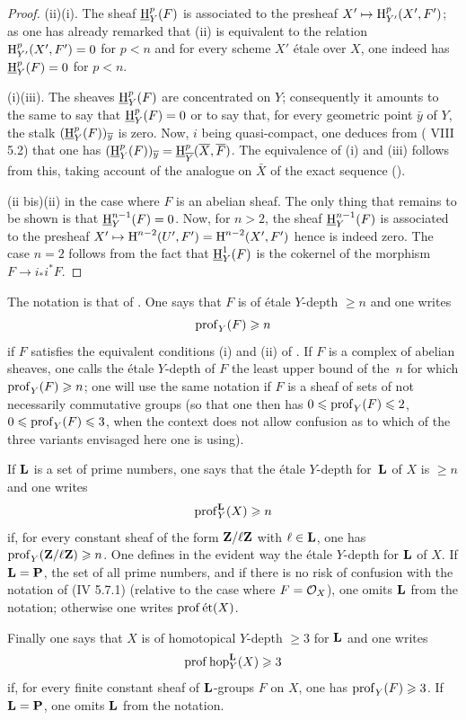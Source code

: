 \begin{proof}
\textup{(ii)}\ALORS \textup{(i)}. The sheaf ${\operatorname{\underline{H}}}_Y^p(F)$ is associated to the presheaf $X'\mto \H_{Y'}^p(X', F')$; as one has already remarked that \textup{(ii)} is equivalent to the relation $\operatorname{H}_{Y'}^p(X', F')=0$ for $p<n$ and for every scheme $X'$ \'etale over $X$, one indeed has ${\operatorname{\underline{H}}}_Y^p(F)=0$ for $p<n$.

\textup{(i)}\SSI \textup{(iii)}. The sheaves ${\operatorname{\underline{H}}}_Y^p(F)$ are concentrated on $Y$; consequently it amounts to the same to say that ${\operatorname{\underline{H}}}_Y^p(F)=0$ or to say that, for every geometric point $\bar y$ of $Y$, the stalk $({\operatorname{\underline{H}}}_Y^p(F))_{\overline y}$ is zero. Now, $i$ being quasi-compact, one deduces from ( VIII 5.2) that one has $({\operatorname{\underline{H}}}_Y^p(F))_{\overline y}={\operatorname{\underline{H}}}_{\overline Y}^p(\overline X, \overline F)$. The equivalence of \textup{(i)} and \textup{(iii)} follows from this, taking account of the analogue on $\bar X$ of the exact sequence ().

(ii bis)\ALORS \textup{(ii)} in the case where $F$ is an abelian sheaf. The only thing that remains to be shown is that ${\operatorname{\underline{H}}}_Y^{n-1}(F)=0$. Now, for $n>2$, the sheaf ${\operatorname{\underline{H}}}_Y^{n-1}(F)$ is associated to the presheaf $X'\mto \H^{n-2}(U', F')=\H^{n-2}(X', F')$ hence is indeed zero. The case $n=2$ follows from the fact that ${\operatorname{\underline{H}}}_Y^1(F)$ is the cokernel of the morphism $F\to i_*i^*F$.
\skipqed
\end{proof}

\begin{definition} \label{XIV.1.2}
The notation is that of . One says that $F$ is of \'etale $Y$-depth $\geq n$ and one writes
$$
\operatorname{prof}_Y(F)\geqslant n$$
if $F$ satisfies the equivalent conditions \textup{(i)} and \textup{(ii)} of . If $F$ is a complex of abelian sheaves, one calls the \'etale $Y$-depth of $F$ the least upper bound of the~$n$ for which $\operatorname{prof}_Y(F)\geqslant n$; one will use the same notation if $F$ is a sheaf of sets \resp of not necessarily commutative groups (so that one then has $0\leqslant \operatorname{prof}_Y(F)\leqslant 2$, \resp $0\leqslant \operatorname{prof}_Y(F)\leqslant 3$, when the context does not allow confusion as to which of the three variants envisaged here one is using).

If $\mathbf{L}$ is a set of prime numbers, one says that the \'etale $Y$-depth for~$\mathbf{L}$ of $X$ is $\geq n$ and one writes
$$
\operatorname{prof}_Y^{\mathbf{L}}(X)\geqslant n
$$
if, for every constant sheaf of the form $\mathbf{Z}/\ell\mathbf{Z}$ with $\ell\in \mathbf{L}$, one has $\operatorname{prof}_Y(\mathbf{Z}/\ell\mathbf{Z})\geqslant n$. One defines in the evident way the \'etale $Y$-depth for $\mathbf{L}$ of $X$. If $\mathbf{L}={\mathbf P}$, the set of all prime numbers, and if there is no risk of confusion with the notation of \textup{(\EGA IV 5.7.1)} (relative to the case where $F=\mathcal{O}_X$), one omits $\mathbf{L}$ from the notation; otherwise one writes $\operatorname{prof} {\textup{\'et}}(X)$.

Finally one says that $X$ is of homotopical $Y$-depth $\geq 3$ for $\mathbf{L} $ and one writes
$$
\operatorname{prof} \operatorname{hop}_Y^{\mathbf{L}}(X)\geqslant 3$$
if, for every finite constant sheaf of $\mathbf{L}$-groups $F$ on $X$, one has $\operatorname{prof}_Y(F)\geqslant 3$. If $\mathbf{L}={\mathbf P}$, one omits $\mathbf{L}$ from the notation.
\end{definition}

